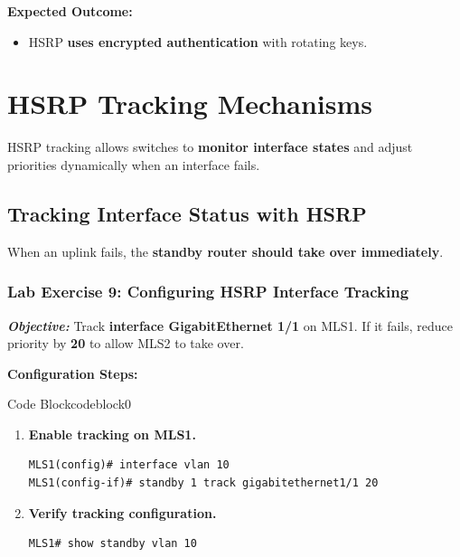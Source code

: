 \documentclass[a4paper]{book}
\begin{document}
\textbf{Expected Outcome:}
\begin{itemize}
\item HSRP \textbf{uses encrypted authentication} with rotating keys.
\end{itemize}


\vspace{1.5em}

\section{HSRP Tracking Mechanisms}
HSRP tracking allows switches to \textbf{monitor interface states} and adjust priorities dynamically 
when an interface fails.

\subsection{Tracking Interface Status with HSRP}
When an uplink fails, the \textbf{standby router should take over immediately}.

\subsubsection{Lab Exercise 9: Configuring HSRP Interface Tracking}
\textbf{\textit{Objective:}} Track \textbf{interface GigabitEthernet 1/1} on MLS1. If it fails, 
reduce priority by \textbf{20} to allow MLS2 to take over.

\vspace{1.5em}

\textbf{Configuration Steps:}

\vspace{1.5em}


\begin{ocg}{Code Block}{codeblock}{0}

\vspace{0.5cm}
\begin{enumerate}
\item \textbf{Enable tracking on MLS1.}
\begin{lstlisting}
MLS1(config)# interface vlan 10
MLS1(config-if)# standby 1 track gigabitethernet1/1 20
\end{lstlisting}

\item \textbf{Verify tracking configuration.}
\begin{lstlisting}
MLS1# show standby vlan 10
\end{lstlisting}
\end{enumerate}
\end{ocg}
\end{document}
